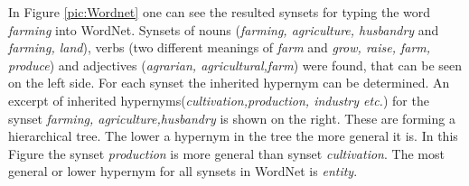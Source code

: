 In Figure \ref{pic:Wordnet} one can see the resulted synsets for typing the word \textit{farming} into WordNet. Synsets of nouns (\textit{farming, agriculture, husbandry} and \textit{farming, land}), verbs (two different meanings of \textit{farm} and \textit{grow, raise, farm, produce}) and adjectives (\textit{agrarian, agricultural,farm}) were found, that can be seen on the left side. For each synset the inherited hypernym can be determined. An excerpt of inherited hypernyms(\textit{cultivation,production, industry etc.}) for the synset \textit{farming, agriculture,husbandry} is shown on the right. These are forming a hierarchical tree. The lower a hypernym in the tree the more general it is. In this Figure the synset \textit{production} is more general than synset \textit{cultivation}. The most general or lower hypernym for all synsets in WordNet is \textit{entity}. 
